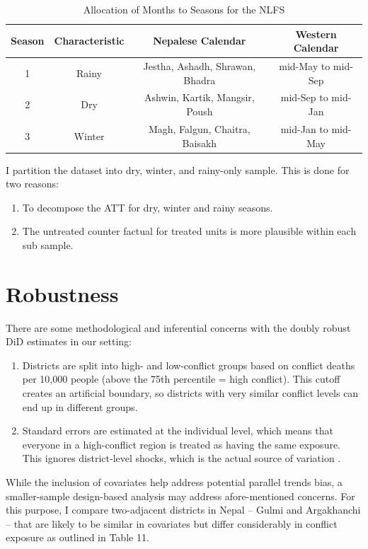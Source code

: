 \documentclass[12pt,a4paper]{article}
\begin{document}
\begin{table}[ht]
	
	\caption{Allocation of Months to Seasons for the NLFS}
	\renewcommand{\arraystretch}{1.2}
	\vspace{1em}
	\centering{}%
	\begin{tabular}{|c|c|c|c|}
		\hline
		\textbf{Season} & \textbf{Characteristic}& \textbf{Nepalese Calendar} & \textbf{Western Calendar}\\
		\hline
		1& Rainy & Jestha, Ashadh, Shrawan, Bhadra & mid-May to mid-Sep\\
		\hline
		2& Dry & Ashwin, Kartik, Mangsir, Poush & mid-Sep to mid-Jan \\
		\hline
		3& Winter & Magh, Falgun, Chaitra, Baisakh &  mid-Jan to mid-May\\
		\hline
	\end{tabular}
\end{table}

I partition the dataset into dry, winter, and rainy-only sample. This is done for two reasons:

\begin{enumerate}
	\item To decompose the ATT for dry, winter and rainy seasons.
	\item The untreated counter factual for treated units is more plausible within each sub sample.
\end{enumerate}

\section{Robustness}
There are some methodological and inferential concerns with the doubly robust DiD estimates in our setting:

\begin{enumerate}
	\item Districts are split into high- and low-conflict groups based on conflict deaths per 10,000 people (above the 75th percentile = high conflict). This cutoff creates an artificial boundary, so districts with very similar conflict levels can end up in different groups.
	\item Standard errors are estimated at the individual level, which means that everyone in a high-conflict region is treated as having the same exposure. This ignores district-level shocks, which is the actual source of variation \parencite{bertrand2004much}.
\end{enumerate}
While the inclusion of covariates help address potential parallel trends bias, a smaller-sample design-based analysis may address afore-mentioned concerns. For this purpose, I compare two-adjacent districts in Nepal -- Gulmi and Argakhanchi -- that are likely to be similar in covariates but differ considerably in conflict exposure as outlined in Table 11.
\end{document}
